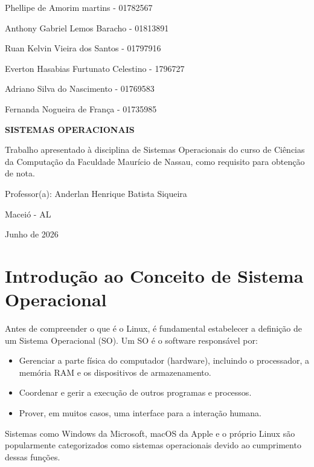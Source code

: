 \documentclass{article}
\begin{document}
\begin{titlepage}

\begin{center}

Phellipe de Amorim martins - 01782567

Anthony Gabriel Lemos Baracho - 01813891

Ruan Kelvin Vieira dos Santos - 01797916

Everton Hasabias Furtunato Celestino - 1796727

Adriano Silva do Nascimento - 01769583

Fernanda Nogueira de França - 01735985

\vspace{6cm}

{\fontsize{16pt}{20pt}\selectfont\textbf{SISTEMAS OPERACIONAIS}}

\vspace{0.5cm}


\end{center}

\vspace{3cm}

\hspace*{7cm}
\parbox{8cm}{
Trabalho apresentado à disciplina de
Sistemas Operacionais do curso de
Ciências da Computação da Faculdade Maurício de Nassau,
como requisito para obtenção de nota.

\vspace{0.5cm}

Professor(a): Anderlan Henrique Batista Siqueira
}

\vfill

\begin{center}

Maceió - AL

Junho de 2026

\end{center}

\end{titlepage}

\tableofcontents
\newpag

\clearpage

\section{Introdução ao Conceito de Sistema Operacional}
Antes de compreender o que é o Linux, é fundamental estabelecer a definição de um Sistema Operacional (SO). Um SO é o software responsável por:
\begin{itemize}
    \item Gerenciar a parte física do computador (hardware), incluindo o processador, a memória RAM e os dispositivos de armazenamento.
    \item Coordenar e gerir a execução de outros programas e processos.
    \item Prover, em muitos casos, uma interface para a interação humana.
\end{itemize}
Sistemas como Windows da Microsoft, macOS da Apple e o próprio Linux são popularmente categorizados como sistemas operacionais devido ao cumprimento dessas funções.
\end{document}
